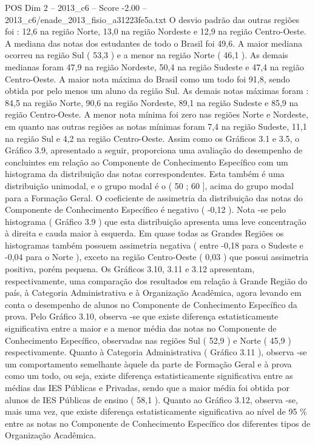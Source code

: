 \begin{textsample}{POS Dim 2 – 2013\_c6 – Score -2.00 – 2013\_c6/enade\_2013\_fisio\_a31223fe5a.txt}
O desvio padrão das outras regiões foi : 12,6 na região Norte, 13,0 na região Nordeste e 12,9 na região Centro-Oeste.
A mediana das notas dos estudantes de todo o Brasil foi 49,6.
A maior mediana ocorreu na região Sul ( 53,3 ) e a menor na região Norte ( 46,1 ).
As demais medianas foram 47,9 na região Nordeste, 50,4 na região Sudeste e 47,4 na região Centro-Oeste.
A maior nota máxima do Brasil como um todo foi 91,8, sendo obtida por pelo menos um aluno da região Sul.
As demais notas máximas foram : 84,5 na região Norte, 90,6 na região Nordeste, 89,1 na região Sudeste e 85,9 na região Centro-Oeste.
A menor nota mínima foi zero nas regiões Norte e Nordeste, em quanto nas outras regiões as notas mínimas foram 7,4 na região Sudeste, 11,1 na região Sul e 4,2 na região Centro-Oeste.
Assim como os Gráficos 3.1 e 3.5, o Gráfico 3.9, apresentado a seguir, proporciona uma avaliação do desempenho de concluintes em relação ao Componente de Conhecimento Específico com um histograma da distribuição das notas correspondentes.
Esta também é uma distribuição unimodal, e o grupo modal é o ( 50 ; 60 ], acima do grupo modal para a Formação Geral.
O coeficiente de assimetria da distribuição das notas do Componente de Conhecimento Específico é negativo ( -0,12 ).
Nota -se pelo histograma ( Gráfico 3.9 ) que esta distribuição apresenta uma leve concentração à direita e cauda maior à esquerda.
Em quase todas as Grandes Regiões os histogramas também possuem assimetria negativa ( entre -0,18 para o Sudeste e -0,04 para o Norte ), exceto na região Centro-Oeste ( 0,03 ) que possui assimetria positiva, porém pequena.
Os Gráficos 3.10, 3.11 e 3.12 apresentam, respectivamente, uma comparação dos resultados em relação à Grande Região do país, à Categoria Administrativa e à Organização Acadêmica, agora levando em conta o desempenho de alunos no Componente de Conhecimento Específico da prova.
Pelo Gráfico 3.10, observa -se que existe diferença estatisticamente significativa entre a maior e a menor média das notas no Componente de Conhecimento Específico, observadas nas regiões Sul ( 52,9 ) e Norte ( 45,9 ) respectivamente.
Quanto à Categoria Administrativa ( Gráfico 3.11 ), observa -se um comportamento semelhante àquele da parte de Formação Geral e à prova como um todo, ou seja, existe diferença estatisticamente significativa entre as médias das IES Públicas e Privadas, sendo que a maior média foi obtida por alunos de IES Públicas de ensino ( 58,1 ).
Quanto ao Gráfico 3.12, observa -se, mais uma vez, que existe diferença estatisticamente significativa ao nível de 95 \% entre as notas no Componente de Conhecimento Específico dos diferentes tipos de Organização Acadêmica.

\end{textsample}
